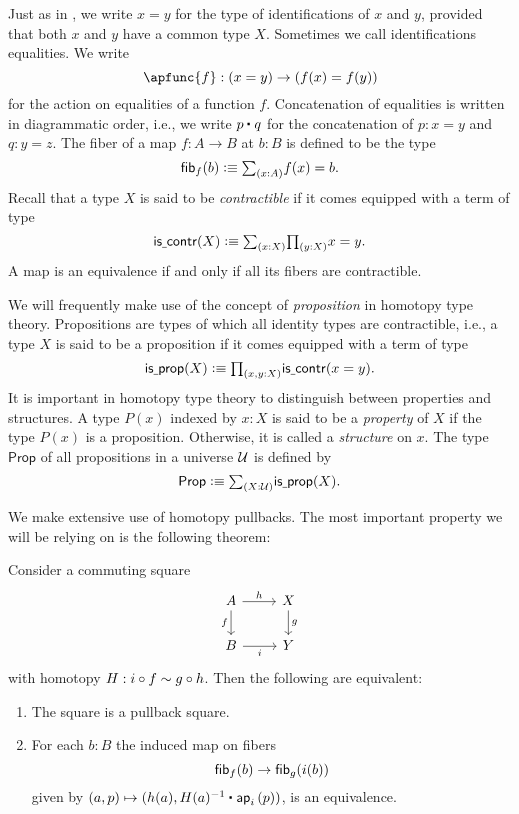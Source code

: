 \documentclass[9pt,twosided]{amsart}
\begin{document}
Just as in \cite{UFP}, we write $x=y$ for the type of identifications of $x$ and $y$, provided that both $x$ and $y$ have a common type $X$. Sometimes we call identifications equalities. We write
\begin{equation*}
  \apfunc{f}:(x=y)\to (f(x)=f(y))
\end{equation*}
for the action on equalities of a function $f$. Concatenation of equalities is written in diagrammatic order, i.e., we write $\ct{p}{q}$ for the concatenation of $p:x=y$ and $q:y=z$. The fiber of a map $f:A\to B$ at $b:B$ is defined to be the type
\begin{equation*}
  \fib{f}{b}\defeq \sm{x:A}f(x)=b.
\end{equation*}
Recall that a type $X$ is said to be \emph{contractible} if it comes equipped with a term of type
\begin{equation*}
  \iscontr(X)\defeq \sm{x:X}\prd{y:X}x=y.
\end{equation*}
A map is an equivalence if and only if all its fibers are contractible.

We will frequently make use of the concept of \emph{proposition} in homotopy type theory. Propositions are types of which all identity types are contractible, i.e., a type $X$ is said to be a proposition if it comes equipped with a term of type
\begin{equation*}
  \isprop(X)\defeq\prd{x,y:X}\iscontr(x=y).
\end{equation*}
It is important in homotopy type theory to distinguish between properties and structures. A type $P(x)$ indexed by $x:X$ is said to be a \emph{property} of $X$ if the type $P(x)$ is a proposition. Otherwise, it is called a \emph{structure} on $x$. The type $\mathsf{Prop}$ of all propositions in a universe $\mathcal{U}$ is defined by
\begin{equation*}
  \mathsf{Prop}\defeq \sm{X:\UU}\isprop(X).
\end{equation*}

We make extensive use of homotopy pullbacks. The most important property we will be relying on is the following theorem:

\begin{thm}\label{thm:pullback}
  Consider a commuting square
  \begin{equation*}
    \begin{tikzcd}
      A \arrow[r,"h"] \arrow[d,swap,"f"] & X \arrow[d,"g"] \\
      B \arrow[r,swap,"i"] & Y
    \end{tikzcd}
  \end{equation*}
  with homotopy $H:i\circ f\sim g\circ h$. Then the following are equivalent:
  \begin{enumerate}
  \item The square is a pullback square.
  \item For each $b:B$ the induced map on fibers
    \begin{equation*}
      \fib{f}{b} \to \fib{g}{i(b)}
    \end{equation*}
    given by $(a,p)\mapsto (h(a),\ct{H(a)^{-1}}{\ap{i}{p}})$, is an equivalence.
  \end{enumerate}
\end{thm}
\end{document}
